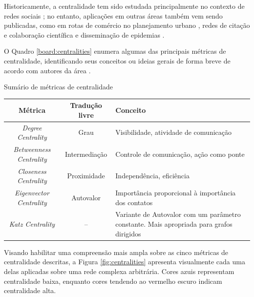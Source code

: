 Historicamente, a centralidade tem sido estudada principalmente no contexto de redes sociais \cite{Bavelas1948,Newman2010}; no entanto, aplicações em outras áreas também vem sendo publicadas, como em rotas de comércio no planejamento urbano \cite{Pitts1965}, redes de citação e colaboração científica \cite{Newman2001} e disseminação de epidemias \cite{Santiago2019}. %

O Quadro \ref{board:centralities} enumera algumas das principais métricas de centralidade, identificando seus conceitos ou ideias gerais de forma breve de acordo com autores da área \cite{Newman2010,Grando2015}.


\begin{quadro}[ht]
    \caption{Sumário de métricas de centralidade}
    \label{board:centralities}
    \fontsize{10}{12}\selectfont
    \def\arraystretch{1.25}
    \begin{tabularx}{\textwidth}{|c|c|Y|}
        \hline
        \textbf{Métrica} & \textbf{Tradução livre} & \textbf{Conceito}
        \\ \hline
        \textit{Degree Centrality} & Grau & Visibilidade, atividade de comunicação
        \\ \hline
        \textit{Betweenness Centrality} & Intermediação & Controle de comunicação, ação como ponte
        \\ \hline
        \textit{Closeness Centrality} & Proximidade & Independência, eficiência
        \\ \hline
        \textit{Eigenvector Centrality} & Autovalor & Importância proporcional à importância dos contatos
        \\ \hline
        \textit{Katz Centrality} & -- & Variante de Autovalor com um parâmetro constante. Mais apropriada para grafos dirigidos
        \\ \hline
    \end{tabularx}
\end{quadro}

Visando habilitar uma compreensão mais ampla sobre as cinco métricas de centralidade descritas, a Figura \ref{fig:centralities} apresenta visualmente cada uma delas aplicadas sobre uma rede complexa arbitrária. Cores azuis representam centralidade baixa, enquanto cores tendendo ao vermelho escuro indicam centralidade alta.

